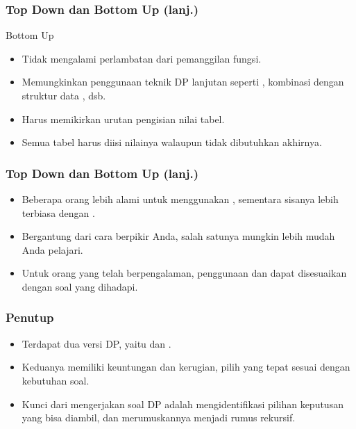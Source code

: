 \begin{frame}
\frametitle{Top Down dan Bottom Up (lanj.)}
Bottom Up
\begin{itemize}
  \item Tidak mengalami perlambatan dari \foverhead pemanggilan fungsi.
  \item Memungkinkan penggunaan teknik DP lanjutan seperti , kombinasi dengan struktur data , dsb.
  \item Harus memikirkan urutan pengisian nilai tabel.
  \item Semua tabel harus diisi nilainya walaupun tidak dibutuhkan akhirnya.
\end{itemize}
\end{frame}

\begin{frame}
\frametitle{Top Down dan Bottom Up (lanj.)}
\begin{itemize}
  \item Beberapa orang lebih alami untuk menggunakan \ftopdown, sementara sisanya lebih terbiasa dengan \fbottomup.
  \item Bergantung dari cara berpikir Anda, salah satunya mungkin lebih mudah Anda pelajari.
  \item Untuk orang yang telah berpengalaman, penggunaan \fbottomup dan \ftopdown dapat disesuaikan dengan soal yang dihadapi.
\end{itemize}
\end{frame}

\begin{frame}
\frametitle{Penutup}
\begin{itemize}
  \item Terdapat dua versi DP, yaitu \ftopdown dan \fbottomup.
  \item Keduanya memiliki keuntungan dan kerugian, pilih yang tepat sesuai dengan kebutuhan soal.
  \item Kunci dari mengerjakan soal DP adalah mengidentifikasi pilihan keputusan yang bisa diambil, dan merumuskannya menjadi rumus rekursif.
\end{itemize}
\end{frame}


